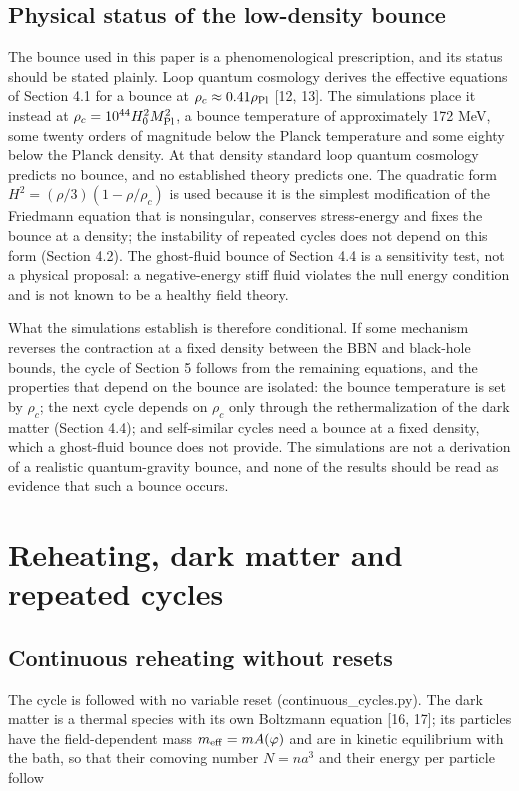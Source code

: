 \documentclass[11pt,a4paper]{article}
\begin{document}
\subsection{Physical status of the low-density bounce}
The bounce used in this paper is a phenomenological prescription, and its status should be stated plainly. Loop quantum cosmology derives the effective equations of Section 4.1 for a bounce at $\rho_c\approx0.41\rho_{\rm Pl}$ [12, 13]. The simulations place it instead at $\rho_c=10^{44}H_0^2M_{\rm Pl}^2$, a bounce temperature of approximately 172 MeV, some twenty orders of magnitude below the Planck temperature and some eighty below the Planck density. At that density standard loop quantum cosmology predicts no bounce, and no established theory predicts one. The quadratic form $H^2=(\rho/3)(1-\rho/\rho_c)$ is used because it is the simplest modification of the Friedmann equation that is nonsingular, conserves stress-energy and fixes the bounce at a density; the instability of repeated cycles does not depend on this form (Section 4.2). The ghost-fluid bounce of Section 4.4 is a sensitivity test, not a physical proposal: a negative-energy stiff fluid violates the null energy condition and is not known to be a healthy field theory.

What the simulations establish is therefore conditional. If some mechanism reverses the contraction at a fixed density between the BBN and black-hole bounds, the cycle of Section 5 follows from the remaining equations, and the properties that depend on the bounce are isolated: the bounce temperature is set by $\rho_c$; the next cycle depends on $\rho_c$ only through the rethermalization of the dark matter (Section 4.4); and self-similar cycles need a bounce at a fixed density, which a ghost-fluid bounce does not provide. The simulations are not a derivation of a realistic quantum-gravity bounce, and none of the results should be read as evidence that such a bounce occurs.

\section{Reheating, dark matter and repeated cycles}
\subsection{Continuous reheating without resets}
The cycle is followed with no variable reset (continuous\_cycles.py). The dark matter is a thermal species with its own Boltzmann equation [16, 17]; its particles have the field-dependent mass $m_{\rm eff}=mA(\varphi)$ and are in kinetic equilibrium with the bath, so that their comoving number $N=na^3$ and their energy per particle follow
\end{document}
